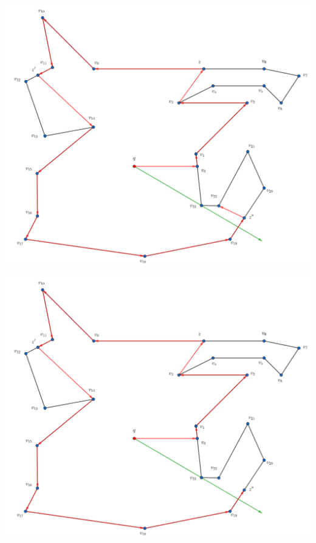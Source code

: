 \begin{frame}
  \centering \includegraphics[width=0.70 \paperwidth]{images/Ejecucion/e34.png}
\end{frame}

\begin{frame}
  \centering \includegraphics[width=0.70 \paperwidth]{images/Ejecucion/e35.png}
\end{frame}

